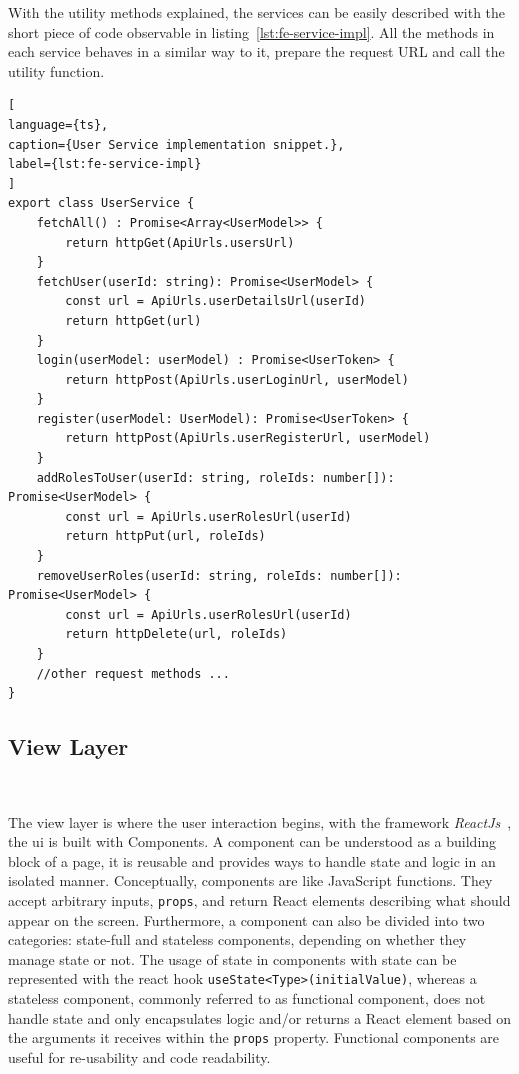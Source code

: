 With the utility methods explained, the services can be easily described with the short piece of code observable in listing~\ref{lst:fe-service-impl}. All the methods in each service behaves in a similar way to it, prepare the request URL and call the utility function.

\begin{lstlisting}[
language={ts},
caption={User Service implementation snippet.},
label={lst:fe-service-impl}
]
export class UserService {
    fetchAll() : Promise<Array<UserModel>> {
        return httpGet(ApiUrls.usersUrl)
    }
    fetchUser(userId: string): Promise<UserModel> {
        const url = ApiUrls.userDetailsUrl(userId)
        return httpGet(url)
    }
    login(userModel: userModel) : Promise<UserToken> {
        return httpPost(ApiUrls.userLoginUrl, userModel)
    }
    register(userModel: UserModel): Promise<UserToken> {
        return httpPost(ApiUrls.userRegisterUrl, userModel)
    }
    addRolesToUser(userId: string, roleIds: number[]): Promise<UserModel> {
        const url = ApiUrls.userRolesUrl(userId)
        return httpPut(url, roleIds)
    }
    removeUserRoles(userId: string, roleIds: number[]): Promise<UserModel> {
        const url = ApiUrls.userRolesUrl(userId)
        return httpDelete(url, roleIds)
    }  
    //other request methods ...
}
\end{lstlisting}


\subsection{View Layer}~\label{ch:impl:sec:fe:subsec:view-layer}

The view layer is where the user interaction begins, with the framework \textit{ReactJs}~\cite{reactjs}, the \acrshort{ui} is built with Components. A component can be understood as a building block of a page, it is reusable and provides ways to handle state and logic in an isolated manner. Conceptually, components are like JavaScript functions. They accept arbitrary inputs, \lstinline{props}, and return React elements describing what should appear on the screen. 
Furthermore, a component can also be divided into two categories: state-full and stateless components, depending on whether they manage state or not. The usage of state in components with state can be represented with the react hook \lstinline{useState<Type>(initialValue)}, whereas a stateless component, commonly referred to as functional component, does not handle state and only encapsulates logic and/or returns a React element based on the arguments it receives within the \lstinline{props} property. Functional components are useful for re-usability and code readability.

